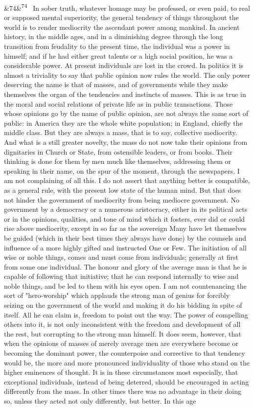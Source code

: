 \documentclass[12pt]{article}
\newcommand{\para}[1][]{\par\noindent\ifx&#1&\else\textsuperscript{\footnotesize #1}~\fi}
\begin{document}
\para[74] In sober truth, whatever homage may be professed, or even paid, to real or supposed mental superiority, the general tendency of things throughout the world is to render mediocrity the ascendant power among mankind. In ancient history, in the middle ages, and in a diminishing degree through the long transition from feudality to the present time, the individual was a power in himself; and if he had either great talents or a high social position, he was a considerable power. At present individuals are lost in the crowd. In politics it is almost a triviality to say that public opinion now rules the world. The only power deserving the name is that of masses, and of governments while they make themselves the organ of the tendencies and instincts of masses. This is as true in the moral and social relations of private life as in public transactions. Those whose opinions go by the name of public opinion, are not always the same sort of public: in America they are the whole white population; in England, chiefly the middle class. But they are always a mass, that is to say, collective mediocrity. And what is a still greater novelty, the mass do not now take their opinions from dignitaries in Church or State, from ostensible leaders, or from books. Their thinking is done for them by men much like themselves, addressing them or speaking in their name, on the spur of the moment, through the newspapers. I am not complaining of all this. I do not assert that anything better is compatible, as a general rule, with the present low state of the human mind. But that does not hinder the government of mediocrity from being mediocre government. No government by a democracy or a numerous aristocracy, either in its political acts or in the opinions, qualities, and tone of mind which it fosters, ever did or could rise above mediocrity, except in so far as the sovereign Many have let themselves be guided (which in their best times they always have done) by the counsels and influence of a more highly gifted and instructed One or Few. The initiation of all wise or noble things, comes and must come from individuals; generally at first from some one individual. The honour and glory of the average man is that he is capable of following that initiative; that he can respond internally to wise and noble things, and be led to them with his eyes open. I am not countenancing the sort of "hero-worship" which applauds the strong man of genius for forcibly seizing on the government of the world and making it do his bidding in spite of itself. All he can claim is, freedom to point out the way. The power of compelling others into it, is not only inconsistent with the freedom and development of all the rest, but corrupting to the strong man himself. It does seem, however, that when the opinions of masses of merely average men are everywhere become or becoming the dominant power, the counterpoise and corrective to that tendency would be, the more and more pronounced individuality of those who stand on the higher eminences of thought. It is in these circumstances most especially, that exceptional individuals, instead of being deterred, should be encouraged in acting differently from the mass. In other times there was no advantage in their doing so, unless they acted not only differently, but better. In this age 
\end{document}
